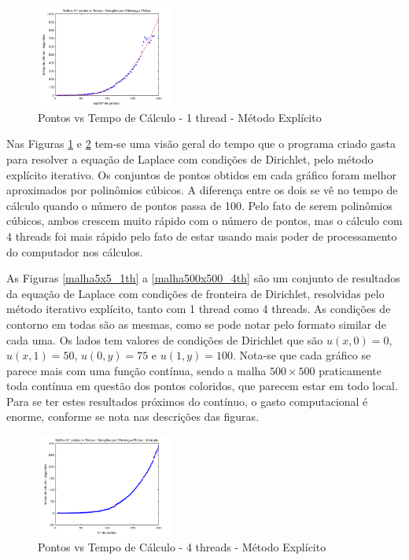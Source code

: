 \documentclass[journal]{IEEEtran}
\begin{document}
\begin{figure}[ht!]
\centering
\includegraphics[width = 0.4\textwidth]{figures/problema01_m1/03.png}
\caption{Pontos vs Tempo de Cálculo - 1 thread - Método Explícito\label{pontos_vs_tempo_1th}}
\end{figure}

Nas Figuras \ref{pontos_vs_tempo_1th} e \ref{pontos_vs_tempo_4th} tem-se uma visão geral do tempo que o programa criado gasta para resolver a equação de Laplace com condições de Dirichlet, pelo método explícito iterativo. Os conjuntos de pontos obtidos em cada gráfico foram melhor aproximados por polinômios cúbicos. A diferença entre os dois se vê no tempo de cálculo quando o número de pontos passa de 100. Pelo fato de serem polinômios cúbicos, ambos crescem muito rápido com o número de pontos, mas o cálculo com 4 threads foi mais rápido pelo fato de estar usando mais poder de processamento do computador nos cálculos.

As Figuras \ref{malha5x5_1th} a \ref{malha500x500_4th} são um conjunto de resultados da equação de Laplace com condições de fronteira de Dirichlet, resolvidas pelo método iterativo explícito, tanto com 1 thread como 4 threads. As condições de contorno em todas são as mesmas, como se pode notar pelo formato similar de cada uma. Os lados tem valores de condições de Dirichlet que são $u(x,0)=0$, $u(x,1)=50$, $u(0,y)=75$ e $u(1,y)=100$. Nota-se que cada gráfico se parece mais com uma função contínua, sendo a malha $500\times 500$ praticamente toda contínua em questão dos pontos coloridos, que parecem estar em todo local. Para se ter estes resultados próximos do contínuo, o gasto computacional é enorme, conforme se nota nas descrições das figuras.

\newpage
\begin{figure}[ht!]

\centering
\includegraphics[width = 0.4\textwidth]{figures/problema01_m1/08.png}
\caption{Pontos vs Tempo de Cálculo - 4 threads - Método Explícito\label{pontos_vs_tempo_4th}}
\end{figure}
\end{document}

